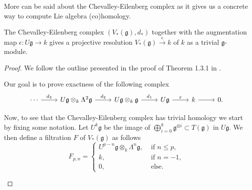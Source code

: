 More can be said about the Chevalley-Eilenberg complex as it gives us a concrete way to compute Lie algebra (co)homology.
\begin{theorem}
  \label{thm:cheval}
  The Chevalley-Eilenberg complex $ (V_{*}(\mathfrak{g}), d_*) $ together with the augmentation map $ \epsilon: U\mathfrak{g} \to k $ gives a projective resolution $ V_*(\mathfrak{g})\xrightarrow{\epsilon} k $ of $ k $ as a trivial $ \mathfrak{g} $-module.
\end{theorem}
\begin{proof}
  We follow the outline presented in the proof of Theorem 1.3.1 in \cite{Jansen2016LieAlgebraCohomology}.

  Our goal is to prove exactness of the following complex
  \[\begin{tikzcd}
	  \cdots & {U\mathfrak{g} \otimes_k \Lambda^2\mathfrak{g}} & {U\mathfrak{g} \otimes_k\mathfrak{g}} & {U\mathfrak{g}} & k & 0.
	  \arrow["{d_3}", from=1-1, to=1-2]
	  \arrow["{d_2}", from=1-2, to=1-3]
	  \arrow["{d_1}", from=1-3, to=1-4]
	  \arrow["\varepsilon", from=1-4, to=1-5]
	  \arrow[from=1-5, to=1-6]
  \end{tikzcd}\]

  Now, to see that the Chevalley-Eilenberg complex has trivial homology we start by fixing some notation. Let $ U^{k}\mathfrak{g} $ be the image of $ \bigoplus_{i = 0}^{k} \mathfrak{g}^{\otimes i} \subset T(\mathfrak{g}) $ in $ U\mathfrak{g} $. We then define a filtration $ F $ of $ V_*(\mathfrak{g}) $ as follows
  \begin{equation}
    F_{p, n} = \begin{cases}
      U^{p - n}\mathfrak{g} \otimes_k \Lambda^{n} \mathfrak{g}, &\text{ if } n \leq p,\\
      k, &\text{ if }  n = -1 ,\\
      0, &\text{ else.}
    \end{cases}
  \end{equation}
  \begin{figure}[t]
    \begin{center}
\end{center}
\end{figure}
\end{proof}
